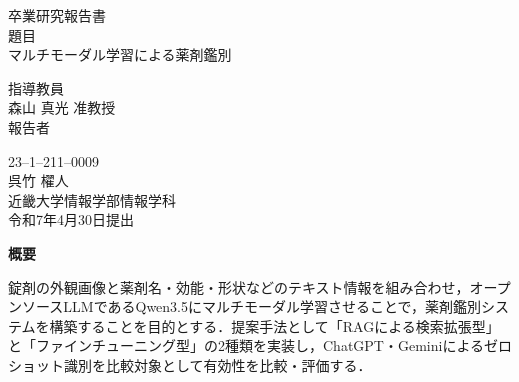 \documentclass{ltjsarticle}
\begin{document}
\pagestyle{empty}

\begin{center}
\vspace*{1cm}
\large
{\LARGE 卒業研究報告書}\\
\vspace*{0.8cm}
題目\\
\vspace*{1cm}
{\Huge {マルチモーダル学習による薬剤鑑別}}\\
\vspace{3mm}

\vspace*{3cm}
指導教員\\
\vspace*{0.3cm}
{\LARGE 森山 真光  准教授}\\
\vspace*{3cm}
報告者\\
\vspace*{0.3cm}

{23--1--211--0009}\\
\vspace*{0.3cm}
{\Huge 呉竹 櫂人}\\
\vspace*{0.5cm}
近畿大学情報学部情報学科\\
\vspace*{2cm}
令和7年4月30日提出\\
\end{center}

\newpage
\normalsize

\clearpage
\begin{center}
{\bf \Large 概要}
\end{center}

錠剤の外観画像と薬剤名・効能・形状などのテキスト情報を組み合わせ，オープンソースLLMであるQwen3.5にマルチモーダル学習させることで，薬剤鑑別システムを構築することを目的とする．提案手法として「RAGによる検索拡張型」と「ファインチューニング型」の2種類を実装し，ChatGPT・Geminiによるゼロショット識別を比較対象として有効性を比較・評価する．

\newpage

\tableofcontents
\newpage
\setcounter{page}{1}
\pagestyle{plain}
\end{document}
